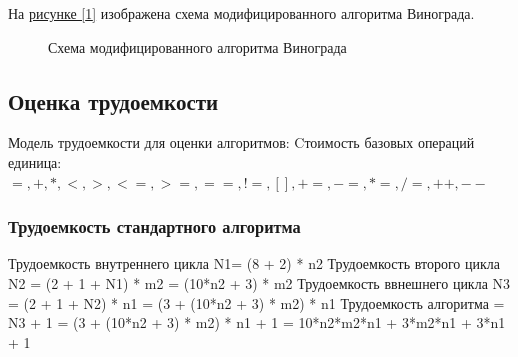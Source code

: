 \documentclass{article}
\begin{document}
	\newpage
	На \hyperref[Algorithm3]{рисунке  [\ref{Algorithm3}]} изображена схема модифицированного алгоритма Винограда.
	\begin{figure}[h!]
		\caption{Схема модифицированного алгоритма Винограда}
		\label{Algorithm3}
	\end{figure}
	\newpage
		 \subsection{Оценка трудоемкости}
		Модель трудоемкости для оценки алгоритмов:
		\newline
		Cтоимость базовых операций единица:
		\newline
		$=,+,*,<,>,<=,>=,==,!=,[],+=,-=,*=,/=,++,--$
		\newline
		\indent 
		\subsubsection{Трудоемкость стандартного алгоритма}
	     Трудоемкость внутреннего цикла N1= (8 + 2) * n2
		\newline
		Трудоемкость второго цикла N2 = (2 + 1 + N1) * m2 = (10*n2 + 3) * m2
		\newline
		Трудоемкость ввнешнего цикла N3 = (2 + 1 + N2) * n1 = (3 + (10*n2 + 3) * m2) * n1
		\newline
		Трудоемкость алгоритма = N3 + 1 = (3 + (10*n2 + 3) * m2) * n1 + 1 = 10*n2*m2*n1 + 3*m2*n1 + 3*n1 + 1
\end{document}
